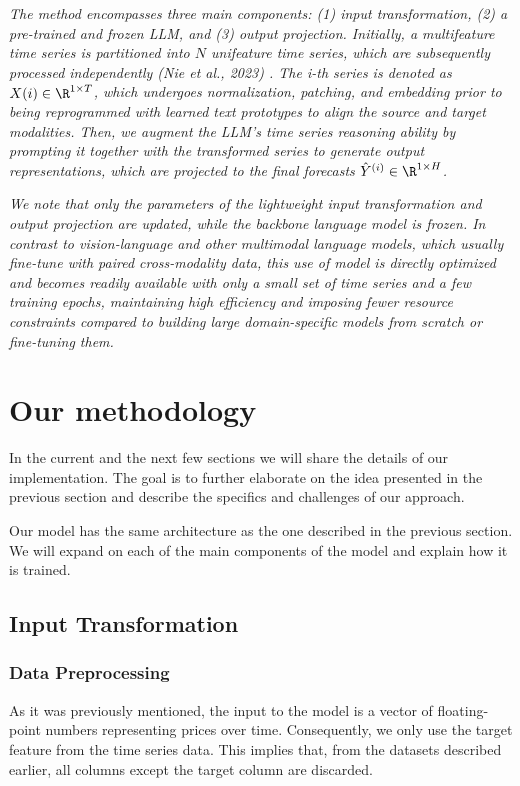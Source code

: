 \textit{The method encompasses three main components: (1) input transformation, (2) a pre-trained and frozen LLM, and (3) output projection. Initially, a multifeature time series is partitioned into \(N\) unifeature time series, which are subsequently processed independently (Nie et al., 2023) \cite{nie_et_al}.
	The i-th series is denoted as \(X(i) \in \R^{1\times T}\), which undergoes normalization, patching, and embedding prior to being reprogrammed with learned text prototypes to align the source and target modalities.
	Then, we augment the LLM’s time series reasoning ability by prompting it together with the transformed series to generate output representations, which are projected to the final forecasts \(\hat{Y}^{(i)} \in \R^{1\times H}\).}

\textit{We note that only the parameters of the lightweight input transformation and output projection are updated, while the backbone language model is frozen.
	In contrast to vision-language and other multimodal language models, which usually fine-tune with paired cross-modality data, this use of model is directly optimized and becomes readily available with only a small set of time series and a few  training epochs, maintaining high efficiency and imposing fewer resource constraints compared to building large domain-specific models from scratch or fine-tuning them.}

\section{Our methodology}
In the current and the next few sections we will share the details of our implementation. The goal is to further elaborate on the idea presented in the previous section and describe the specifics and challenges of our approach.

Our model has the same architecture as the one described in the previous section. We will expand on each of the main components of the model and explain how it is trained.

\subsection{Input Transformation}

\subsubsection*{Data Preprocessing}
As it was previously mentioned, the input to the model is a vector of floating-point numbers representing prices over time. Consequently, we only use the target feature from the time series data. This implies that, from the datasets described earlier, all columns except the target column are discarded.

